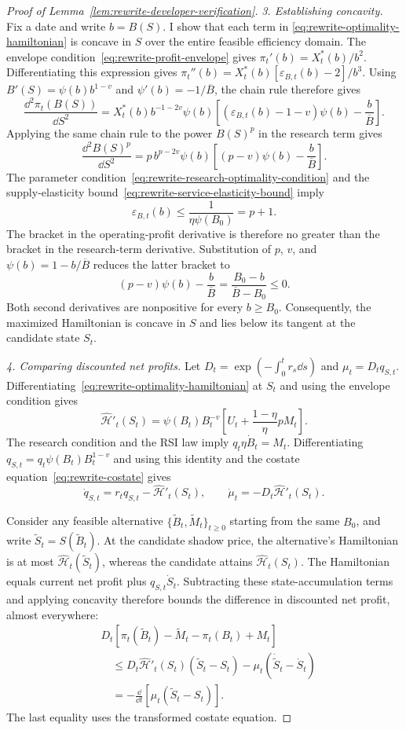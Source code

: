 \begin{proof}[Proof of Lemma~\ref{lem:rewrite-developer-verification}]
\emph{3. Establishing concavity.}
Fix a date and write $b=B(S)$. I show that each term in
\eqref{eq:rewrite-optimality-hamiltonian} is concave in $S$ over the
entire feasible efficiency domain.
The envelope condition~\eqref{eq:rewrite-profit-envelope} gives
$\pi_t'(b)=X_t^*(b)/b^2$. Differentiating this expression gives
$\pi_t''(b)=X_t^*(b)[\varepsilon_{B,t}(b)-2]/b^3$.
Using $B'(S)=\psi(b)b^{1-v}$ and $\psi'(b)=-1/\overline B$,
the chain rule therefore gives
\[
 \frac{\dd^2\pi_t(B(S))}{\dd S^2}
 =X_t^*(b)b^{-1-2v}\psi(b)
 \left[(\varepsilon_{B,t}(b)-1-v)\psi(b)-\frac b{\overline B}\right].
\]
Applying the same chain rule to the power $B(S)^p$ in the research term gives
\[
 \frac{\dd^2 B(S)^p}{\dd S^2}
 =p\,b^{p-2v}\psi(b)
 \left[(p-v)\psi(b)-\frac b{\overline B}\right].
\]
The parameter condition~\eqref{eq:rewrite-research-optimality-condition}
and the supply-elasticity bound~\eqref{eq:rewrite-service-elasticity-bound}
imply
\[
 \varepsilon_{B,t}(b)\leq\frac1{\eta\psi(B_0)}=p+1.
\]
The bracket in the operating-profit derivative is therefore no greater
than the bracket in the research-term derivative. Substitution of $p$,
$v$, and $\psi(b)=1-b/\overline B$ reduces the latter bracket to
\[
 (p-v)\psi(b)-\frac b{\overline B}
 =\frac{B_0-b}{\overline B-B_0}\leq0.
\]
Both second derivatives are nonpositive for every $b\geq B_0$.
Consequently, the maximized Hamiltonian is concave in $S$ and lies
below its tangent at the candidate state $S_t$.

\emph{4. Comparing discounted net profits.}
Let $D_t=\exp(-\int_0^t r_s\dd s)$ and $\mu_t=D_tq_{S,t}$.
Differentiating~\eqref{eq:rewrite-optimality-hamiltonian} at $S_t$ and
using the envelope condition gives
\[
 \widehat{\mathcal H}'_t(S_t)
 =\psi(B_t)B_t^{-v}
 \left[U_t+\frac{1-\eta}{\eta}pM_t\right].
\]
The research condition and the RSI law imply
$q_t\eta\dot B_t=M_t$. Differentiating
$q_{S,t}=q_t\psi(B_t)B_t^{1-v}$ and using this identity and the
costate equation~\eqref{eq:rewrite-costate} gives
\[
 \dot q_{S,t}=r_tq_{S,t}-\widehat{\mathcal H}'_t(S_t),
 \qquad
 \dot\mu_t=-D_t\widehat{\mathcal H}'_t(S_t).
\]

Consider any feasible alternative
$\{\widetilde B_t,\widetilde M_t\}_{t\geq0}$ starting from the same $B_0$,
and write $\widetilde S_t=S(\widetilde B_t)$.
At the candidate shadow price, the alternative's Hamiltonian is at most
$\widehat{\mathcal H}_t(\widetilde S_t)$, whereas the candidate attains
$\widehat{\mathcal H}_t(S_t)$.
The Hamiltonian equals current net profit plus $q_{S,t}\dot S_t$.
Subtracting these state-accumulation terms and applying concavity
therefore bounds the difference in discounted net profit, almost everywhere:
\[
 \begin{aligned}
 &D_t\left[\pi_t(\widetilde B_t)-\widetilde M_t-\pi_t(B_t)+M_t\right]\\
 &\quad\leq
 D_t\widehat{\mathcal H}'_t(S_t)(\widetilde S_t-S_t)
 -\mu_t(\dot{\widetilde S}_t-\dot S_t)\\
 &\quad=-\frac{\dd}{\dd t}
 \left[\mu_t(\widetilde S_t-S_t)\right].
\end{aligned}
\]
The last equality uses the transformed costate equation.


\end{proof}
